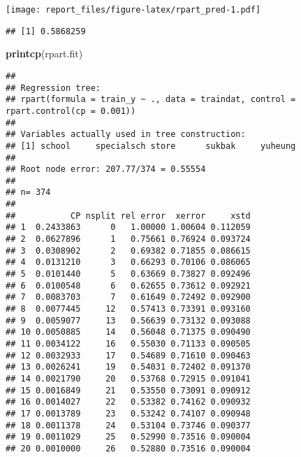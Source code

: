 \documentclass[]{article}
\newenvironment{Shaded}{\begin{snugshade}}{\end{snugshade}}
\newcommand{\DataTypeTok}[1]{\textcolor[rgb]{0.13,0.29,0.53}{#1}}
\newcommand{\DecValTok}[1]{\textcolor[rgb]{0.00,0.00,0.81}{#1}}
\newcommand{\KeywordTok}[1]{\textcolor[rgb]{0.13,0.29,0.53}{\textbf{#1}}}
\newcommand{\NormalTok}[1]{#1}
\newcommand{\OperatorTok}[1]{\textcolor[rgb]{0.81,0.36,0.00}{\textbf{#1}}}
\newcommand{\StringTok}[1]{\textcolor[rgb]{0.31,0.60,0.02}{#1}}
\begin{document}
\begin{Shaded}
\end{Shaded}

\texttt{[image: report\_files/figure-latex/rpart\_pred-1.pdf]}

\begin{Shaded}
\end{Shaded}

\begin{verbatim}
## [1] 0.5868259
\end{verbatim}

\begin{Shaded}
\begin{Highlighting}[]
\KeywordTok{printcp}\NormalTok{(rpart.fit)}
\end{Highlighting}
\end{Shaded}

\begin{verbatim}
## 
## Regression tree:
## rpart(formula = train_y ~ ., data = traindat, control = rpart.control(cp = 0.001))
## 
## Variables actually used in tree construction:
## [1] school     specialsch store      sukbak     yuheung   
## 
## Root node error: 207.77/374 = 0.55554
## 
## n= 374 
## 
##           CP nsplit rel error  xerror     xstd
## 1  0.2433863      0   1.00000 1.00604 0.112059
## 2  0.0627896      1   0.75661 0.76924 0.093724
## 3  0.0308902      2   0.69382 0.71855 0.086615
## 4  0.0131210      3   0.66293 0.70106 0.086065
## 5  0.0101440      5   0.63669 0.73827 0.092496
## 6  0.0100548      6   0.62655 0.73612 0.092921
## 7  0.0083703      7   0.61649 0.72492 0.092900
## 8  0.0077445     12   0.57413 0.73391 0.093160
## 9  0.0059077     13   0.56639 0.73132 0.093088
## 10 0.0050885     14   0.56048 0.71375 0.090490
## 11 0.0034122     16   0.55030 0.71133 0.090505
## 12 0.0032933     17   0.54689 0.71610 0.090463
## 13 0.0026241     19   0.54031 0.72402 0.091370
## 14 0.0021790     20   0.53768 0.72915 0.091041
## 15 0.0016849     21   0.53550 0.73091 0.090912
## 16 0.0014027     22   0.53382 0.74162 0.090932
## 17 0.0013789     23   0.53242 0.74107 0.090948
## 18 0.0011378     24   0.53104 0.73746 0.090377
## 19 0.0011029     25   0.52990 0.73516 0.090004
## 20 0.0010000     26   0.52880 0.73516 0.090004
\end{verbatim}
\end{document}
